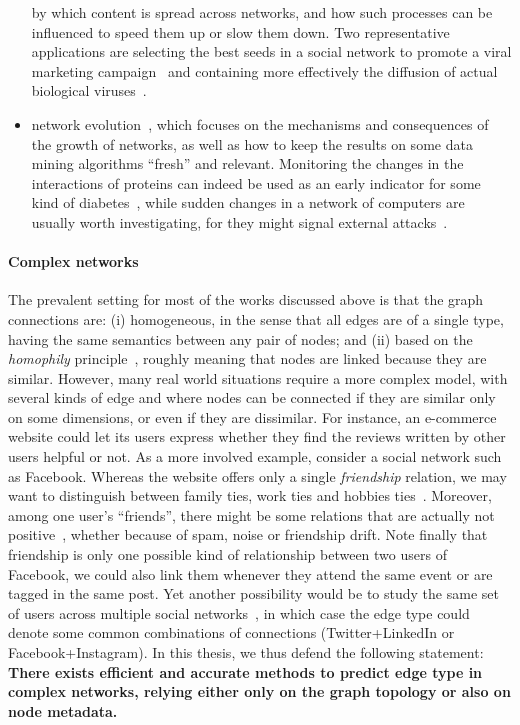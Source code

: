 \begin{itemize}[nosep,leftmargin=*]
    by which content is spread across networks, and how such processes can be influenced to speed
    them up or slow them down. Two representative applications are selecting the best seeds in a social
    network to promote a viral marketing campaign~\autocite{infmaxKempe15} and containing more effectively the
    diffusion of actual biological viruses~\autocite{influenceBio13}.
  \item network evolution~\autocite{networkEvolution14}, which focuses on the mechanisms and
    consequences of the growth of networks, as well as how to keep the results on some data
    mining algorithms \enquote{fresh} and relevant. Monitoring the changes in the interactions of
    proteins can indeed be used as an early indicator for some kind of
    diabetes~\autocite{evolBio10}, while sudden changes in a network of computers are usually worth
    investigating, for they might signal external attacks~\autocite{evolSecurity04}.
\end{itemize}

\vspace{-\baselineskip}
\paragraph{Complex networks}

The prevalent setting for most of the works discussed above is that the graph connections are: (i)
homogeneous, in the sense that all edges are of a single type, having the same semantics  between
any pair of nodes; and (ii) based on the \emph{homophily} principle~\autocite{Homophily01}, roughly
meaning that nodes are linked because they are similar. However, many real world situations require
a more complex model, with several kinds of edge and where nodes can be connected if they are
similar only on some dimensions, or even if they are dissimilar. For instance, an e-commerce website
could let its users express whether they find the reviews written by other users helpful or not. As a
more involved example, consider a social network such as Facebook. Whereas the website offers only a
single \emph{friendship} relation, we may want to distinguish between family ties, work ties and
hobbies ties~\autocite{LeskovecEgo12}. Moreover, among one user's \enquote{friends}, there might be some
relations that are actually not positive~\autocite{Yang2012}, whether because of spam, noise or
friendship drift. Note finally that friendship is only one possible kind of relationship between two
users of Facebook, we could also link them whenever they attend the same event or are tagged in the
same post. Yet another possibility would be to study the same set of users across multiple social
networks~\autocite{mergingNetworks16}, in which case the edge type could denote some common
combinations of connections (\eg Twitter+LinkedIn or Facebook+Instagram). In this thesis, we thus
defend the following statement: \textbf{There exists efficient and accurate methods to predict edge
type in complex networks, relying either only on the graph topology or also on node metadata.}

